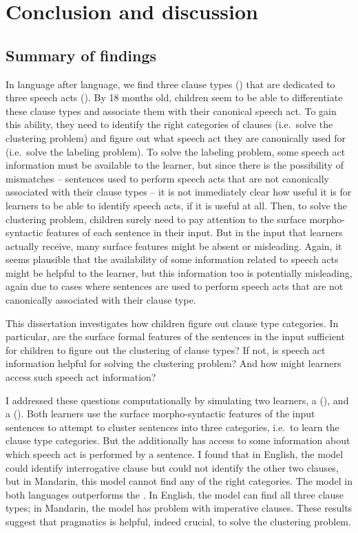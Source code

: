 \chapter{Conclusion and discussion}
\label{chap:discussion}

\section{Summary of findings}
In language after language, we find three clause types (\diis{}) that are dedicated to three speech acts (\aqrs{}). By 18 months old, children seem to be able to differentiate these clause types and associate them with their canonical speech act. To gain this ability, they need to identify the right categories of clauses (i.e.\ solve the clustering problem) and figure out what speech act they are canonically used for (i.e.\ solve the labeling problem). To solve the labeling problem, some speech act information must be available to the learner, but since there is the possibility of mismatches -- sentences used to perform speech acts that are not canonically associated with their clause types -- it is not immediately clear how useful it is for learners to be able to identify speech acts, if it is useful at all. Then, to solve the clustering problem, children surely need to pay attention to the surface morpho-syntactic features of each sentence in their input. But in the input that learners actually receive, many surface features might be absent or misleading. Again, it seems plausible that the availability of some information related to speech acts might be helpful to the learner, but this information too is potentially misleading, again due to cases where sentences are used to perform speech acts that are not canonically associated with their clause type.

This dissertation investigates how children figure out clause type categories. In particular, are the surface formal features of the sentences in the input sufficient for children to figure out the clustering of clause types? If not, is speech act information helpful for solving the clustering problem? And how might learners access such speech act information?

I addressed these questions computationally by simulating two learners, a \distlearner{} (\dlearnerabbr{}), and a \praglearner{} (\plearnerabbr{}). Both learners use the surface morpho-syntactic features of the input sentences to attempt to cluster sentences into three categories, i.e.\ to learn the clause type categories. But the \plearnerabbr{} additionally has access to some information about which speech act is performed by a sentence. I found that in English, the \dlearnerabbr{} model could identify interrogative clause but could not identify the other two clauses, but in Mandarin, this model cannot find any of the right categories. The \plearnerabbr{} model in both languages outperforms the \dlearnerabbr{}. In English, the \plearnerabbr{} model can find all three clause types; in Mandarin, the model has problem with imperative clauses. These results suggest that pragmatics is helpful, indeed crucial, to solve the clustering problem. 


